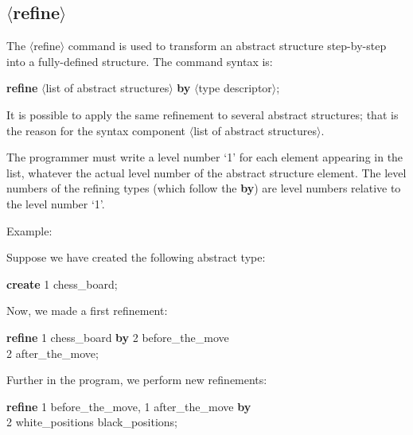 \documentclass[openany,nobib]{tufte-book}
\newcommand{\kw}[1]{{\bf #1}}
\newcommand{\sym}[1]{$\langle$#1$\rangle$}
\begin{document}
\subsection{\sym{refine}}

The \sym{refine} command is used to transform an abstract structure
step-by-step into a fully-defined structure. The command syntax is:

\medskip

\-\hspace{0.8cm} \kw{refine} \sym{list of abstract structures} \kw{by}
\sym{type descriptor};

\medskip\noindent
It is possible to apply the same refinement to several abstract structures;
that is the reason for the syntax component \sym{list of abstract structures}.

The programmer must write a level number `1' for each element appearing in the
list, whatever the actual level number of the abstract structure element. The
level numbers of the refining types (which follow the \kw{by}) are level
numbers relative to the level number `1'.

Example:

Suppose we have created the following abstract type:

\medskip

\-\hspace{0.8cm} \kw{create} 1 chess\_board;

\medskip\noindent
Now, we made a first refinement:
\medskip

\-\hspace{0.8cm} \kw{refine} 1 chess\_board \kw{by} 2 before\_the\_move \\
\-\hspace{5.35cm} 2 after\_the\_move;

\medskip\noindent
Further in the program, we perform new refinements:

\medskip

\-\hspace{0.8cm} \kw{refine} 1 before\_the\_move, 1 after\_the\_move \kw{by}\\
\-\hspace{3cm} 2 white\_positions  black\_positions;
\end{document}
